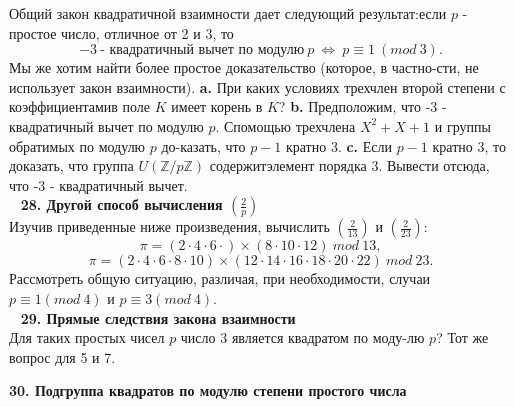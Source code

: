 \documentclass{mai_book}
\begin{document}
    Общий закон квадратичной взаимности дает следующий результат:\newline если $p$ - простое число, отличное от 2 и 3, то 
    $$
    -3~\text{- квадратичный вычет по модулю}~p\ \Longleftrightarrow\ p\equiv 1\ (mod\ 3).
    $$
\noindent Мы же хотим найти более простое доказательство (которое, в частно-\newline сти, не использует закон взаимности).\newline
\hspace*{15pt}\textbf{a.} При каких условиях трехчлен второй степени с коэффициентами\newline в поле $K$ имеет корень в $K$?\newline
\hspace*{15pt}\textbf{b.} Предположим, что -3 - квадратичный вычет по модулю $p$. С\newline помощью трехчлена $X^2+X+1$ и группы обратимых по модулю $p$ до-\newline казать, что $p-1$ кратно 3.\newline
\hspace*{15pt}\textbf{c.} Если $p-1$ кратно 3, то доказать, что группа $U(\mathbb{Z}/p\mathbb{Z})$ содержит\newline элемент порядка 3. Вывести отсюда, что -3 - квадратичный вычет.\\
\ \newline
\noindent\textbf{28. Другой способ вычисления $(\frac{2}{p})$}\\

    Изучив приведенные ниже произведения, вычислить $(\frac{2}{13})$ и $(\frac{2}{23})$:
    $$
    \pi = (2\cdot 4\cdot 6\cdot)\times (8\cdot 10\cdot 12)\ mod\ 13,
    $$
    $$
    \pi = (2\cdot 4\cdot 6\cdot 8\cdot 10)\times (12\cdot 14\cdot 16\cdot 18\cdot 20\cdot 22)\ mod\ 23.
    $$
\noindent Рассмотреть общую ситуацию, различая, при необходимости, случаи\newline $p\equiv 1 (mod\ 4)$ и $p\equiv 3 (mod\ 4).$\\
\ \newline
\noindent\textbf{29. Прямые следствия закона взаимности}\\

    Для таких простых чисел $p$ число 3 является квадратом по моду-\newline лю $p$? Тот же вопрос для 5 и 7.\newline
    
\newpage

\noindent\textbf{30. Подгруппа квадратов по модулю степени простого числа}\\
\end{document}
